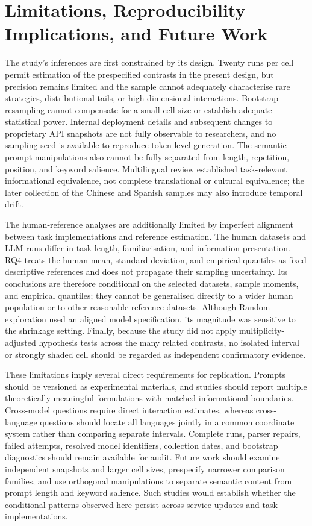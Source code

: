 \documentclass[logo,msc]{infthesis}
\begin{document}
\section{Limitations, Reproducibility Implications, and Future Work}

The study's inferences are first constrained by its design. Twenty runs per cell permit estimation of the prespecified contrasts in the present design, but precision remains limited and the sample cannot adequately characterise rare strategies, distributional tails, or high-dimensional interactions. Bootstrap resampling cannot compensate for a small cell size or establish adequate statistical power. Internal deployment details and subsequent changes to proprietary API snapshots are not fully observable to researchers, and no sampling seed is available to reproduce token-level generation. The semantic prompt manipulations also cannot be fully separated from length, repetition, position, and keyword salience. Multilingual review established task-relevant informational equivalence, not complete translational or cultural equivalence; the later collection of the Chinese and Spanish samples may also introduce temporal drift.

The human-reference analyses are additionally limited by imperfect alignment between task implementations and reference estimation. The human datasets and LLM runs differ in task length, familiarisation, and information presentation. RQ4 treats the human mean, standard deviation, and empirical quantiles as fixed descriptive references and does not propagate their sampling uncertainty. Its conclusions are therefore conditional on the selected datasets, sample moments, and empirical quantiles; they cannot be generalised directly to a wider human population or to other reasonable reference datasets. Although Random exploration used an aligned model specification, its magnitude was sensitive to the shrinkage setting. Finally, because the study did not apply multiplicity-adjusted hypothesis tests across the many related contrasts, no isolated interval or strongly shaded cell should be regarded as independent confirmatory evidence.

These limitations imply several direct requirements for replication. Prompts should be versioned as experimental materials, and studies should report multiple theoretically meaningful formulations with matched informational boundaries. Cross-model questions require direct interaction estimates, whereas cross-language questions should locate all languages jointly in a common coordinate system rather than comparing separate intervals. Complete runs, parser repairs, failed attempts, resolved model identifiers, collection dates, and bootstrap diagnostics should remain available for audit. Future work should examine independent snapshots and larger cell sizes, prespecify narrower comparison families, and use orthogonal manipulations to separate semantic content from prompt length and keyword salience. Such studies would establish whether the conditional patterns observed here persist across service updates and task implementations.
\end{document}
